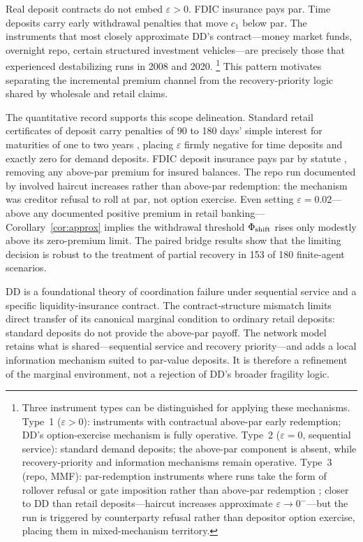 \documentclass[12pt]{article}\usepackage[]{graphicx}\usepackage[]{xcolor}
\begin{document}
Real deposit contracts do not embed $\varepsilon > 0$.
FDIC insurance pays par.
Time deposits carry early withdrawal penalties that move $c_1$ below par.
The instruments that most closely approximate DD's contract---money market funds, overnight repo, certain structured investment vehicles---are precisely those that experienced destabilizing runs in 2008 and 2020.
\footnote{Three instrument types can be distinguished for applying these mechanisms.
Type~1 ($\varepsilon > 0$): instruments with contractual above-par early redemption; DD's option-exercise mechanism is fully operative.
Type~2 ($\varepsilon = 0$, sequential service): standard demand deposits; the above-par component is absent, while recovery-priority and information mechanisms remain operative.
Type~3 (repo, MMF): par-redemption instruments where runs take the form of rollover refusal or gate imposition rather than above-par redemption \citep{gorton2012securitized}; closer to DD than retail deposits---haircut increases approximate $\varepsilon \to 0^{-}$---but the run is triggered by counterparty refusal rather than depositor option exercise, placing them in mixed-mechanism territory.}
This pattern motivates separating the incremental premium channel from the recovery-priority logic shared by wholesale and retail claims.

The quantitative record supports this scope delineation.
Standard retail certificates of deposit carry penalties of 90 to 180 days' simple interest for maturities of one to two years \citep{reg_d, reg_dd}, placing $\varepsilon$ firmly negative for time deposits and exactly zero for demand deposits.
FDIC deposit insurance pays par by statute \citep{fdia_1821f}, removing any above-par premium for insured balances.
The repo run documented by \citet{gorton2012securitized} involved haircut increases rather than above-par redemption: the mechanism was creditor refusal to roll at par, not option exercise.
Even setting $\varepsilon = 0.02$---above any documented positive premium in retail banking---Corollary~\ref{cor:approx} implies the withdrawal threshold $\Phi_{\rm shift}$ rises only modestly above its zero-premium limit.
The paired bridge results show that the limiting decision is robust to the treatment of partial recovery in 153 of 180 finite-agent scenarios.

DD is a foundational theory of coordination failure under sequential service and a specific liquidity-insurance contract.
The contract-structure mismatch limits direct transfer of its canonical marginal condition to ordinary retail deposits: standard deposits do not provide the above-par payoff.
The network model retains what is shared---sequential service and recovery priority---and adds a local information mechanism suited to par-value deposits.
It is therefore a refinement of the marginal environment, not a rejection of DD's broader fragility logic.
\end{document}
